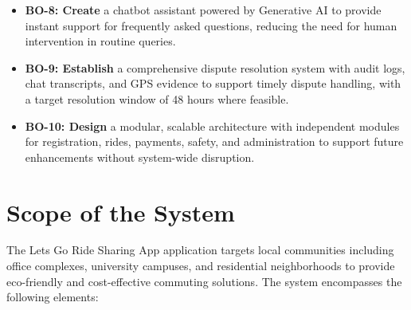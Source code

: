\begin{itemize}
    \item \textbf{BO-8: Create} a chatbot assistant powered by Generative AI to provide instant support for frequently asked questions, reducing the need for human intervention in routine queries.
    
    \item \textbf{BO-9: Establish} a comprehensive dispute resolution system with audit logs, chat transcripts, and GPS evidence to support timely dispute handling, with a target resolution window of 48 hours where feasible.
    
    \item \textbf{BO-10: Design} a modular, scalable architecture with independent modules for registration, rides, payments, safety, and administration to support future enhancements without system-wide disruption.
\end{itemize}


\section{Scope of the System}

The Lets Go Ride Sharing App application targets local communities including office complexes, university campuses, and residential neighborhoods to provide eco-friendly and cost-effective commuting solutions. The system encompasses the following elements:

